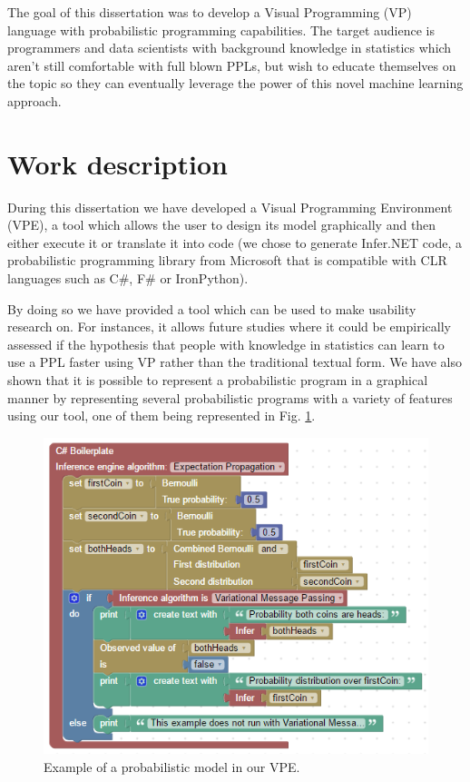 \documentclass[9pt,a4paper]{extarticle}
\begin{document}
\begin{multicols}{2}
The goal of this dissertation was to develop a Visual Programming (VP) language with
probabilistic programming capabilities. The target audience is programmers and data scientists
with background knowledge in statistics which aren’t still comfortable with full blown PPLs, but
wish to educate themselves on the topic so they can eventually leverage the power of this novel
machine learning approach.

\section{Work description}

During this dissertation we have developed a Visual Programming Environment (VPE),
a tool which allows the user to design its model graphically and then either
execute it or translate it into code (we chose to generate Infer.NET code,
a probabilistic programming library from Microsoft that is compatible with CLR
languages such as C\#, F\# or IronPython).

By doing so we have provided a tool which can be used to make usability research
on. For instances, it allows future studies where it could be empirically assessed if the hypothesis that people
with knowledge in statistics can learn to use a PPL faster using VP
rather than the traditional textual form. We have also shown that it is possible
to represent a probabilistic program in a graphical manner by representing several
probabilistic programs with a variety of features using our tool, one of them being
represented in Fig. \ref{fig:first}.

\begin{figure}[H]
\centerline{\includegraphics[scale=.6]{firstExample.png}}
\caption{Example of a probabilistic model in our VPE.}
\label{fig:first}
\end{figure}


\end{multicols}
\end{document}
